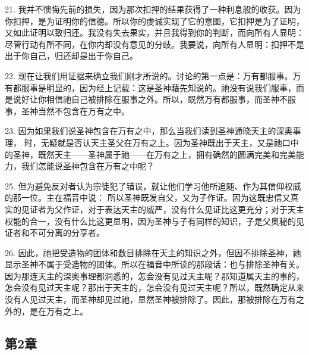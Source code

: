 21. 我并不懊悔先前的损失，因为那次扣押的结果获得了一种利息般的收获。因为你扣押，是为证明你的信德。所以你的虔诚实现了它的意图，它扣押是为了证明，又如此证明以致归还。我没有失去果实，并且我得到你的判断，而向所有人显明：尽管行动有所不同，在你内却没有意见的分歧。我要说，向所有人显明：扣押不是出于你自己，归还却是出于你自己。\par

22. 现在让我们用证据来确立我们刚才所说的。讨论的第一点是：万有都服事。万有都服事是明显的，因为经上记载：这是圣神藉先知说的。祂没有说我们服事，而是说好让你相信祂自己被排除在服事之外。所以，既然万有都服事，而圣神不服事，圣神当然不包含在万有之中。\par

23. 因为如果我们说圣神包含在万有之中，那么当我们读到圣神通晓天主的深奥事理， 时，无疑就是否认天主圣父在万有之上。因为圣神既出于天主，又是祂口中的圣神，既然天主——圣神属于祂——在万有之上，拥有确然的圆满完美和完美能力，我们怎能说圣神包含在万有之中呢？\par

25. 但为避免反对者认为宗徒犯了错误，就让他们学习他所追随、作为其信仰权威的那一位。主在福音中说： 所以圣神既发自父，又为子作证。因为这既忠信又真实的见证者为父作证，对于表达天主的威严，没有什么见证比这更充分；对于天主权能的合一，没有什么比这更显明，因为圣神与子有同样的知识，子是父奥秘的见证者和不可分离的分享者。\par

26. 因此，祂把受造物的团体和数目排除在天主的知识之外，但因不排除圣神，祂显示圣神不属于受造物的团体。所以在福音中所读的那段话：也与排除圣神有关。因为那连天主的深奥事理都洞悉的，怎会没有见过天主呢？那知道属天主的事的，怎会没有见过天主呢？那出于天主的，怎会没有见过天主呢？所以，既然确定从来没有人见过天主，而圣神却见过祂，显然圣神被排除了。因此，那被排除在万有之外的，是在万有之上。\par


\subsection{第2章}

